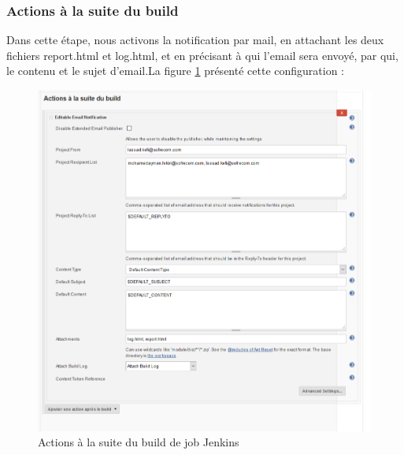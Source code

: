 \subsubsection{Actions à la suite du build}
Dans cette étape, nous activons la notification par mail, en attachant les  deux fichiers report.html et log.html, et en précisant à qui l'email sera envoyé, par qui, le contenu et le sujet d'email.La figure \ref{fig:actions-after} présenté cette configuration :
\begin{figure}[H]
	\centering
	\includegraphics[width=1\linewidth]{"img/jenkins/actions after"}
	\caption[Actions à la suite du build de job Jenkins]{Actions à la suite du build de job Jenkins}
	\label{fig:actions-after}
\end{figure}

